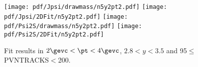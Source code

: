 \begin{figure}[H]
\begin{center}
\texttt{[image: pdf/Jpsi/drawmass/n5y2pt2.pdf]}
\texttt{[image: pdf/Jpsi/2DFit/n5y2pt2.pdf]}
\vspace*{-0.5cm}
\texttt{[image: pdf/Psi2S/drawmass/n5y2pt2.pdf]}
\texttt{[image: pdf/Psi2S/2DFit/n5y2pt2.pdf]}
\vspace*{-0.5cm}
\end{center}
\caption{Fit results in $2\gevc<\pt<4\gevc$, $2.8<y<3.5$ and 95$\leq$PVNTRACKS$<$200.}
\label{Fitn5y2pt2}
\end{figure}
